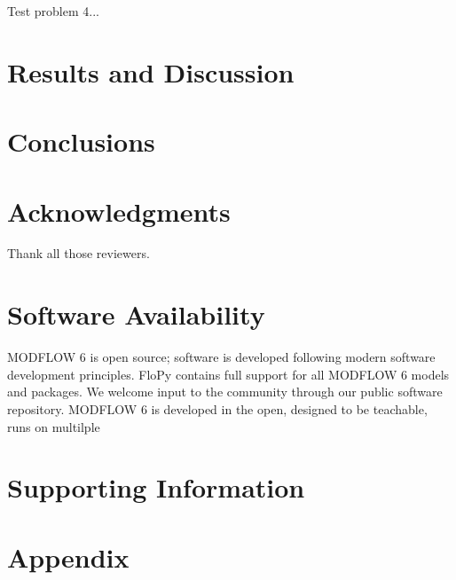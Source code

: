 \documentclass{article}
\begin{document}
Test problem 4...

\section{Results and Discussion}

\section{Conclusions}

\section{Acknowledgments}
Thank all those reviewers.

\section{Software Availability}
MODFLOW 6 is open source; software is developed following modern software development principles.  FloPy \citep{bakker2016scripting} contains full support for all MODFLOW 6 models and packages.  We welcome input to the community through our public software repository.  MODFLOW 6 is developed in the open, designed to be teachable, runs on multilple

\section{Supporting Information}

\section{Appendix}


\end{document}
